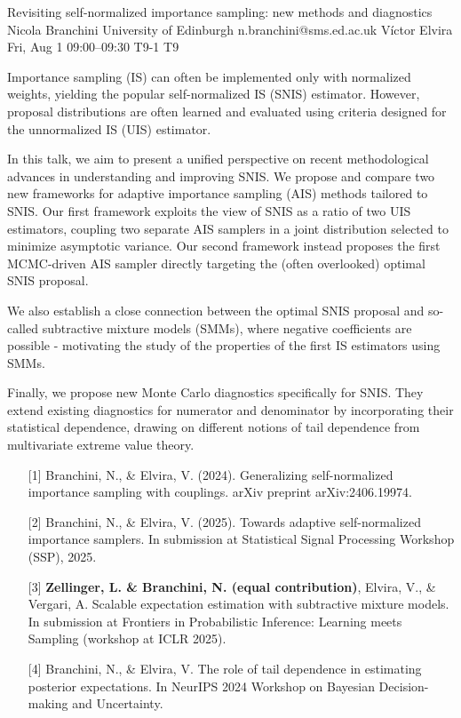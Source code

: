 \begin{talk}
  {Revisiting self-normalized importance sampling: new methods and diagnostics}%
  {Nicola Branchini}%
  {University of Edinburgh}%
  {n.branchini@sms.ed.ac.uk}%
  {Víctor Elvira}%
  {}%
  {Fri, Aug 1 09:00–09:30}%
  {T9-1}%
  {T9}%
  
				
			
Importance sampling (IS) can often be implemented only with normalized weights, yielding the popular self-normalized IS (SNIS) estimator. However, proposal distributions are often learned and evaluated using criteria designed for the unnormalized IS (UIS) estimator.

In this talk, we aim to present a unified perspective on recent methodological advances in understanding and improving SNIS.
We propose and compare two new frameworks for adaptive importance sampling (AIS) methods tailored to SNIS. Our first framework exploits the view of SNIS as a ratio of two UIS estimators, coupling two separate AIS samplers in a joint distribution selected to minimize asymptotic variance. Our second framework instead proposes the first MCMC-driven AIS sampler directly targeting the (often overlooked) optimal SNIS proposal.

We also establish a close connection between the optimal SNIS proposal and so-called subtractive mixture models (SMMs), where negative coefficients are possible - motivating the study of the properties of the first IS estimators using SMMs.

Finally, we propose new Monte Carlo diagnostics specifically for SNIS. They extend existing diagnostics for numerator and denominator by incorporating their statistical dependence, drawing on different notions of tail dependence from multivariate extreme value theory.

\medskip

\begin{enumerate}
	\item[{[1]}] Branchini, N., \& Elvira, V. (2024). Generalizing self-normalized importance sampling with couplings. arXiv preprint arXiv:2406.19974.
	\item[{[2]}] Branchini, N., \& Elvira, V. (2025). Towards adaptive self-normalized importance samplers. In submission at Statistical Signal Processing Workshop (SSP), 2025.
    \item[{[3]}] \textbf{Zellinger, L. \& Branchini, N. (equal contribution)}, Elvira, V., \& Vergari, A. Scalable expectation estimation with subtractive mixture models. In submission at Frontiers in Probabilistic Inference: Learning meets Sampling (workshop at ICLR 2025).
    \item[{[4]}] Branchini, N., \& Elvira, V. The role of tail dependence in estimating posterior expectations. In NeurIPS 2024 Workshop on Bayesian Decision-making and Uncertainty.


\end{enumerate}

\end{talk}

